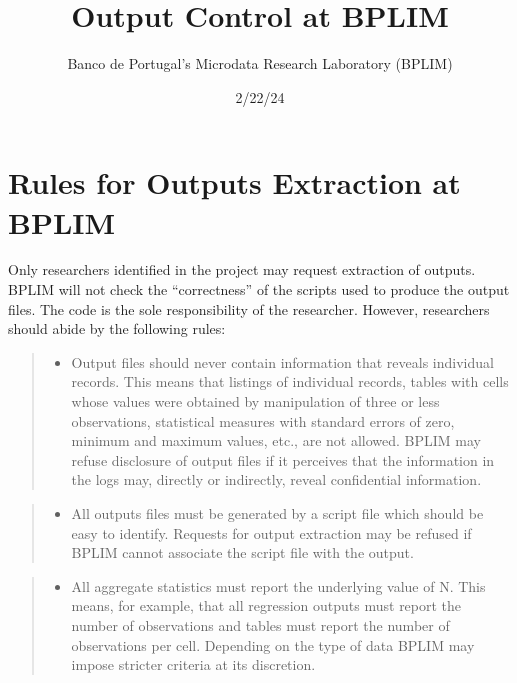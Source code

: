\documentclass[
  a4paper,
  DIV=11,
  numbers=noendperiod]{scrartcl}
\title{Output Control at BPLIM}
\author{Banco de Portugal's Microdata Research Laboratory (BPLIM)}
\date{2/22/24}
\providecommand{\tightlist}{%
  \setlength{\itemsep}{0pt}\setlength{\parskip}{0pt}}\usepackage{longtable,booktabs,array}
\begin{document}
\maketitle
\ifdefined\Shaded\renewenvironment{Shaded}{\begin{tcolorbox}[breakable, frame hidden, interior hidden, borderline west={3pt}{0pt}{shadecolor}, sharp corners, boxrule=0pt, enhanced]}{\end{tcolorbox}}\fi

\hypertarget{rules-for-outputs-extraction-at-bplim}{%
\section{Rules for Outputs Extraction at
BPLIM}\label{rules-for-outputs-extraction-at-bplim}}

Only researchers identified in the project may request extraction of
outputs. BPLIM will not check the ``correctness'' of the scripts used to
produce the output files. The code is the sole responsibility of the
researcher. However, researchers should abide by the following rules:

\begin{quote}
\begin{itemize}
\tightlist
\item
  Output files should never contain information that reveals individual
  records. This means that listings of individual records, tables with
  cells whose values were obtained by manipulation of three or less
  observations, statistical measures with standard errors of zero,
  minimum and maximum values, etc., are not allowed. BPLIM may refuse
  disclosure of output files if it perceives that the information in the
  logs may, directly or indirectly, reveal confidential information.
\end{itemize}
\end{quote}

\begin{quote}
\begin{itemize}
\tightlist
\item
  All outputs files must be generated by a script file which should be
  easy to identify. Requests for output extraction may be refused if
  BPLIM cannot associate the script file with the output.
\end{itemize}
\end{quote}

\begin{quote}
\begin{itemize}
\tightlist
\item
  All aggregate statistics must report the underlying value of N. This
  means, for example, that all regression outputs must report the number
  of observations and tables must report the number of observations per
  cell. Depending on the type of data BPLIM may impose stricter criteria
  at its discretion.
\end{itemize}
\end{quote}
\end{document}
